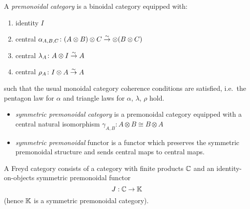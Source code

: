 \begin{frame}
\begin{definition}
    A \emph{premonoidal category} is a binoidal category equipped with:
    \begin{enumerate}
        \item identity $I$
        \item central $\alpha_{A,B,C}\colon (A \otimes B) \otimes C \overset{\sim}{\to}
            \otimes (B \otimes C)$
        \item central $\lambda_A\colon A \otimes I \overset{\sim}{\to} A$
        \item central $\rho_A\colon I \otimes A \overset{\sim}{\to} A$
    \end{enumerate}

    such that the usual monoidal category coherence conditions are satisfied,
    i.e.~the pentagon law for $\alpha$ and triangle laws for $\alpha$,
    $\lambda$, $\rho$ hold.
\end{definition}
\end{frame}

\begin{frame}
\begin{itemize}
    \item \emph{symmetric premonoidal category} is a premonoidal category
        equipped with a central natural isomorphism $\gamma_{A,B} : A\otimes B
        \cong B\otimes A$

    \item \emph{symmetric premonoidal} functor is a functor which preserves the
        symmetric premonoidal structure and sends central maps to central maps.
\end{itemize}
\end{frame}

\begin{frame}
\begin{definition}
    A Freyd category consists of a category with finite products $\mathbb{C}$
    and an identity-on-objects symmetric premonoidal functor
    \[ J: \mathbb{C} \to \mathbb{K} \]
    (hence $\mathbb{K}$ is a symmetric premonoidal category).
\end{definition}
\end{frame}
